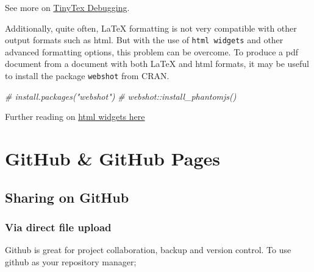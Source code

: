 \documentclass[
]{book}
\newenvironment{Shaded}{\begin{snugshade}}{\end{snugshade}}
\newcommand{\CommentTok}[1]{\textcolor[rgb]{0.56,0.35,0.01}{\textit{#1}}}
\begin{document}
See more on \href{https://yihui.org/tinytex/r/}{TinyTex Debugging}.

Additionally, quite often, LaTeX formatting is not very compatible with other output formats such as html. But with the use of \texttt{html\ widgets} and other advanced formatting options, this problem can be overcome.
To produce a pdf document from a document with both LaTeX and html formats, it may be useful to install the package \texttt{webshot} from CRAN.

\begin{Shaded}
\begin{Highlighting}[]
\CommentTok{\# install.packages("webshot")  }
\CommentTok{\# webshot::install\_phantomjs() }
\end{Highlighting}
\end{Shaded}

Further reading on \href{https://bookdown.org/yihui/bookdown/html-widgets.html}{html widgets here}

\hypertarget{github-github-pages}{%
\chapter{GitHub \& GitHub Pages}\label{github-github-pages}}

\hypertarget{sharing-on-github}{%
\section{Sharing on GitHub}\label{sharing-on-github}}

\hypertarget{via-direct-file-upload}{%
\subsection{Via direct file upload}\label{via-direct-file-upload}}

Github is great for project collaboration, backup and version control.
To use github as your repository manager;
\end{document}

